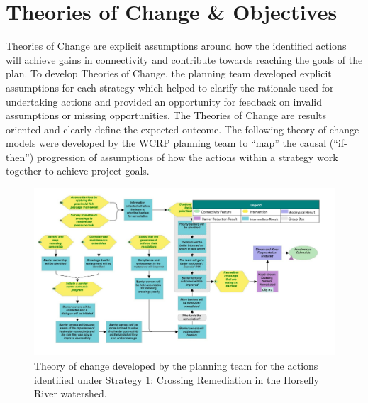 \documentclass[
  letterpaper,
  DIV=11,
  numbers=noendperiod]{scrreprt}
\begin{document}
\hypertarget{theories-of-change-objectives}{%
\section*{Theories of Change \&
Objectives}\label{theories-of-change-objectives}}


Theories of Change are explicit assumptions around how the identified
actions will achieve gains in connectivity and contribute towards
reaching the goals of the plan. To develop Theories of Change, the
planning team developed explicit assumptions for each strategy which
helped to clarify the rationale used for undertaking actions and
provided an opportunity for feedback on invalid assumptions or missing
opportunities. The Theories of Change are results oriented and clearly
define the expected outcome. The following theory of change models were
developed by the WCRP planning team to ``map'' the causal (``if-then'')
progression of assumptions of how the actions within a strategy work
together to achieve project goals.

\begin{figure}

{\centering \includegraphics{images/figure4.png}

}

\caption{\label{fig-stra1}Theory of change developed by the planning
team for the actions identified under Strategy 1: Crossing Remediation
in the Horsefly River watershed.}

\end{figure}
\end{document}
